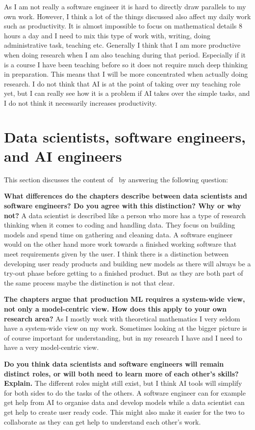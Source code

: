 \documentclass[a4paper, 11pt]{article}
\begin{document}
As I am not really a software engineer it is hard to directly draw parallels to my own work. However, I think a lot of the things discussed also affect my daily work such as productivity. It is almost impossible to focus on mathematical details 8 hours a day and I need to mix this type of work with, writing, doing administrative task, teaching etc. Generally I think that I am more productive when doing research when I am also teaching during that period. Especially if it is a course I have been teaching before so it does not require much deep thinking in preparation. This means that I will be more concentrated when actually doing research. I do not think that AI is at the point of taking over my teaching role yet, but I can really see how it is a problem if AI takes over the simple tasks, and I do not think it necessarily increases productivity. 

\section{Data scientists, software engineers, and AI engineers}
This section discusses the content of~\cite{kastner2025machine} by answering the following question:

\textbf{What differences do the chapters describe between data scientists and software engineers? Do you agree with this distinction? Why or why not?}
A data scientist is described like a person who more has a type of research thinking when it comes to coding and handling data. They focus on building models and spend time on gathering and cleaning data. A software engineer would on the other hand more work towards a finished working software that meet requirements given by the user. I think there is a distinction between developing user ready products and building new models as there will always be a try-out phase before getting to a finished product. But as they are both part of the same process maybe the distinction is not that clear.

\textbf{The chapters argue that production ML requires a system-wide view, not only a model-centric view. How does this apply to your own research area?}
As I mostly work with theoretical mathematics I very seldom have a system-wide view on my work. Sometimes looking at the bigger picture is of course important for understanding, but in my research I have and I need to have a very model-centric view. 

\textbf{Do you think data scientists and software engineers will remain distinct roles, or will both need to learn more of each other’s skills? Explain.} 
The different roles might still exist, but I think AI tools will simplify for both sides to do the tasks of the others. A software engineer can for example get help from AI to organise data and develop models while a data scientist can get help to create user ready code. This might also make it easier for the two to collaborate as they can get help to understand each other's work.
\end{document}
